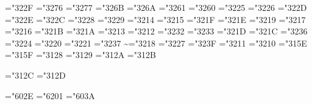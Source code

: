 \mathchardef\propto="322F
\mathchardef\sqsubseteq="3276
\mathchardef\sqsupseteq="3277
\mathchardef\parallel="326B
\mathchardef\mid="326A
\mathchardef\dashv="3261
\mathchardef\vdash="3260
\mathchardef\nearrow="3225
\mathchardef\searrow="3226
\mathchardef\nwarrow="322D
\mathchardef\swarrow="322E
\mathchardef\Leftrightarrow="322C
\mathchardef\Leftarrow="3228
\mathchardef\Rightarrow="3229
\def\neq{\not=} \let\ne=\neq
\mathchardef\leq="3214 \let\le=\leq
\mathchardef\geq="3215 \let\ge=\geq
\mathchardef\succ="321F
\mathchardef\prec="321E
\mathchardef\approx="3219
\mathchardef\succeq="3217
\mathchardef\preceq="3216
\mathchardef\supset="321B
\mathchardef\subset="321A
\mathchardef\supseteq="3213
\mathchardef\subseteq="3212
\mathchardef\in="3232
\mathchardef\ni="3233 \let\owns=\ni
\mathchardef\gg="321D
\mathchardef\ll="321C
\mathchardef\not="3236
\mathchardef\leftrightarrow="3224
\mathchardef\leftarrow="3220 \let\gets=\leftarrow
\mathchardef\rightarrow="3221 \let\to=\rightarrow
\mathchardef\mapstochar="3237 \def\mapsto{\mapstochar\rightarrow}
\mathchardef\sim="3218
\mathchardef\simeq="3227
\mathchardef\perp="323F
\mathchardef\equiv="3211
\mathchardef\asymp="3210
\mathchardef\smile="315E
\mathchardef\frown="315F
\mathchardef\leftharpoonup="3128
\mathchardef\leftharpoondown="3129
\mathchardef\rightharpoonup="312A
\mathchardef\rightharpoondown="312B

\def\joinrel{\mathrel{\mkern-3mu}}
\def\relbar{\mathrel{\smash-}} %
\def\Relbar{\mathrel=}
\mathchardef\lhook="312C \def\hookrightarrow{\lhook\joinrel\rightarrow}
\mathchardef\rhook="312D \def\hookleftarrow{\leftarrow\joinrel\rhook}
\def\bowtie{\mathrel\triangleright\joinrel\mathrel\triangleleft}
\def\models{\mathrel|\joinrel=}
\def\Longrightarrow{\Relbar\joinrel\Rightarrow}
\def\longrightarrow{\relbar\joinrel\rightarrow}
\def\longleftarrow{\leftarrow\joinrel\relbar}
\def\Longleftarrow{\Leftarrow\joinrel\Relbar}
\def\longmapsto{\mapstochar\longrightarrow}
\def\longleftrightarrow{\leftarrow\joinrel\rightarrow}
\def\Longleftrightarrow{\Leftarrow\joinrel\Rightarrow}
\def\iff{\;\Longleftrightarrow\;}

\mathchardef\ldotp="602E %
\mathchardef\cdotp="6201 %
\mathchardef\colon="603A %
\def\ldots{\mathinner{\ldotp\ldotp\ldotp}}
\def\cdots{\mathinner{\cdotp\cdotp\cdotp}}
\def\vdots{\vbox{\baselineskip4\p@ \lineskiplimit\z@
    \kern6\p@\hbox{.}\hbox{.}\hbox{.}}}
\def\ddots{\mathinner{\mkern1mu\raise7\p@\vbox{\kern7\p@\hbox{.}}\mkern2mu
    \raise4\p@\hbox{.}\mkern2mu\raise\p@\hbox{.}\mkern1mu}}

